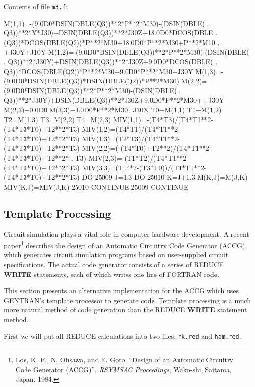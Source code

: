 Contents of file {\tt m3.f}:

\begin{framedverbatim}
      M(1,1)=-(9.0D0*DSIN(DBLE(Q3))**2*P**2*M30)-(DSIN(DBLE(
     . Q3))**2*Y*J30)+DSIN(DBLE(Q3))**2*J30Z+18.0D0*DCOS(DBLE
     . (Q3))*DCOS(DBLE(Q2))*P**2*M30+18.0D0*P**2*M30+P**2*M10
     . +J30Y+J10Y
      M(1,2)=-(9.0D0*DSIN(DBLE(Q3))**2*P**2*M30)-(DSIN(DBLE(
     . Q3))**2*J30Y)+DSIN(DBLE(Q3))**2*J30Z+9.0D0*DCOS(DBLE(
     . Q3))*DCOS(DBLE(Q2))*P**2*M30+9.0D0*P**2*M30+J30Y
      M(1,3)=-(9.0D0*DSIN(DBLE(Q3))*DSIN(DBLE(Q2))*P**2*M30)
      M(2,2)=-(9.0D0*DSIN(DBLE(Q3))**2*P**2*M30)-(DSIN(DBLE(
     . Q3))**2*J30Y)+DSIN(DBLE(Q3))**2*J30Z+9.0D0*P**2*M30+
     . J30Y
      M(2,3)=0.0D0
      M(3,3)=9.0D0*P**2*M30+J30X
      T0=M(1,1)
      T1=M(1,2)
      T2=M(1,3)
      T3=M(2,2)
      T4=M(3,3)
      MIV(1,1)=-(T4*T3)/(T4*T1**2-(T4*T3*T0)+T2**2*T3)
      MIV(1,2)=(T4*T1)/(T4*T1**2-(T4*T3*T0)+T2**2*T3)
      MIV(1,3)=(T2*T3)/(T4*T1**2-(T4*T3*T0)+T2**2*T3)
      MIV(2,2)=(-(T4*T0)+T2**2)/(T4*T1**2-(T4*T3*T0)+T2**2*
     . T3)
      MIV(2,3)=-(T1*T2)/(T4*T1**2-(T4*T3*T0)+T2**2*T3)
      MIV(3,3)=(T1**2-(T3*T0))/(T4*T1**2-(T4*T3*T0)+T2**2*T3)
      DO 25009 J=1,3
          DO 25010 K=J+1,3
              M(K,J)=M(J,K)
              MIV(K,J)=MIV(J,K)
25010     CONTINUE
25009 CONTINUE
\end{framedverbatim}

\subsection{Template Processing} 
 
Circuit simulation plays a vital role in computer hardware
development.  A recent paper\footnote{Loe, K. F., N. Ohsawa, and E.
Goto.  ``Design of an Automatic Circuitry Code Generator (ACCG)'',
{\it RSYMSAC Proceedings}, Wako-shi, Saitama, Japan.  1984.} describes
the design of an Automatic Circuitry Code Generator (ACCG), which
generates circuit simulation programs based on user-supplied circuit
specifications.  The actual code generator consists of a series of
REDUCE {\bf WRITE} statements, each of which writes one line of
FORTRAN code.

This section presents an alternative implementation for the ACCG
which uses GENTRAN's template processor to generate code.  Template
processing is a much more natural method of code generation than the
REDUCE {\bf WRITE} statement method.

First we will put all REDUCE calculations into two files:  {\tt rk.red} and
{\tt ham.red}.


